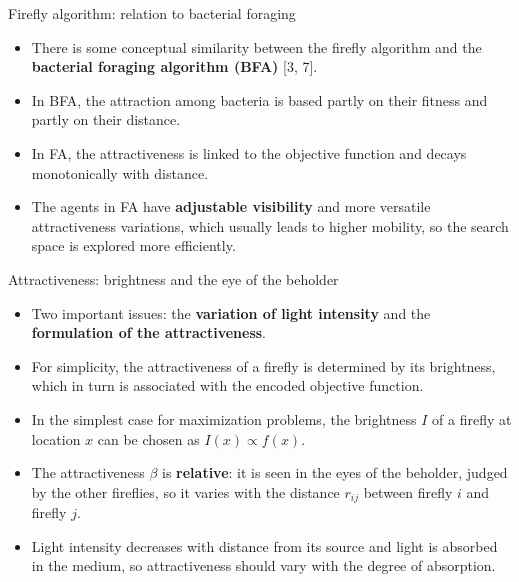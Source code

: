 \documentclass[aspectratio=169,11pt]{beamer}
\newcommand{\hdr}[1]{\gdef\curhdr{#1}}
\gdef\curhdr{}
\begin{document}
\begin{frame}[t]{Firefly algorithm: relation to bacterial foraging}
\begin{itemize}\itemsep0.8em
  \item There is some conceptual similarity between the firefly algorithm and the \textbf{bacterial foraging algorithm (BFA)} [3, 7].
  \item In BFA, the attraction among bacteria is based partly on their fitness and partly on their distance.
  \item In FA, the attractiveness is linked to the objective function and decays monotonically with distance.
  \item The agents in FA have \textbf{adjustable visibility} and more versatile attractiveness variations, which usually leads to higher mobility, so the search space is explored more efficiently.
\end{itemize}
\end{frame}

\hdr{3 Firefly Algorithm \textperiodcentered{} 3.3 Attractiveness}
\begin{frame}[t]{Attractiveness: brightness and the eye of the beholder}
\begin{itemize}\itemsep0.6em
  \item Two important issues: the \textbf{variation of light intensity} and the \textbf{formulation of the attractiveness}.
  \item For simplicity, the attractiveness of a firefly is determined by its brightness, which in turn is associated with the encoded objective function.
  \item In the simplest case for maximization problems, the brightness $I$ of a firefly at location $x$ can be chosen as $I(x)\propto f(x)$.
  \item The attractiveness $\beta$ is \textbf{relative}: it is seen in the eyes of the beholder, judged by the other fireflies, so it varies with the distance $r_{ij}$ between firefly $i$ and firefly $j$.
  \item Light intensity decreases with distance from its source and light is absorbed in the medium, so attractiveness should vary with the degree of absorption.
\end{itemize}
\end{frame}
\end{document}
